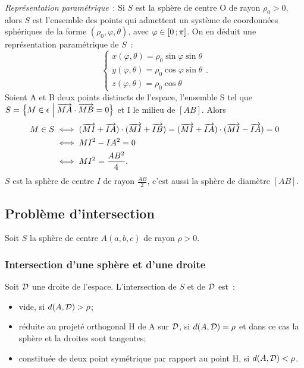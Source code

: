 \emph{Représentation paramétrique}~: Si \(S\) est la sphère de centre O de 
rayon \(\rho_0 > 0\), alors \(S\) est l'ensemble des points qui admettent un 
système de coordonnées sphériques de la forme \((\rho_0, \varphi, \theta)\), 
avec \(\varphi\in\left[ 0 \, ;  \pi \right]\). On en déduit une représentation 
paramétrique de \(S\)~:
\begin{equation}
  \begin{cases}
    x(\varphi, \theta)=\rho_0\sin\varphi\sin\theta\\
    y(\varphi, \theta)=\rho_0\cos\varphi\sin\theta\\
    z(\varphi, \theta)=\rho_0\cos\theta
  \end{cases}.
\end{equation}
Soient A et B deux points distincts de l'espace, l'ensemble S tel que \(S = 
\left\{M \in \epsilon\mathrel{}\middle|\mathrel{}\overrightarrow{MA}\cdot\overrightarrow{MB}=0\right\}\) et I le milieu de \([AB]\).  
Alors
\begin{align}
  M \in S & \iff (\overrightarrow{MI} + \overrightarrow{IA}) \cdot (\overrightarrow{MI} + \overrightarrow{IB}) = 
  (\overrightarrow{MI} + \overrightarrow{IA}) \cdot (\overrightarrow{MI} - \overrightarrow{IA}) = 0\\
          &\iff MI^2 - IA^2 = 0\\
          &\iff MI^2 = \frac{AB^2}{4}.
\end{align}
\(S\) est la sphère de centre \(I\) de rayon \(\frac{AB}{2}\), c'est aussi la 
sphère de diamètre \([AB]\).

\subsection{Problème d'intersection}
Soit \(S\) la sphère de centre \(A(a, b, c)\) de rayon \(\rho>0\).

\subsubsection{Intersection d'une sphère et d'une droite}

\begin{prop}
  Soit \(\mathcal{D}\) une droite de l'espace. L'intersection de \(S\) et de \(\mathcal{D}\) 
  est~:
  \begin{itemize}
    \item vide, si \(d(A, \mathcal{D})>\rho\);
    \item réduite au projeté orthogonal H de A sur \(\mathcal{D}\), si \(d(A, \mathcal{D}) = 
      \rho\) et dans ce cas la sphère et la droites sont tangentes;
    \item constituée de deux point symétrique par rapport au point H, si 
      \(d(A, \mathcal{D}) < \rho\).
  \end{itemize}
\end{prop}

